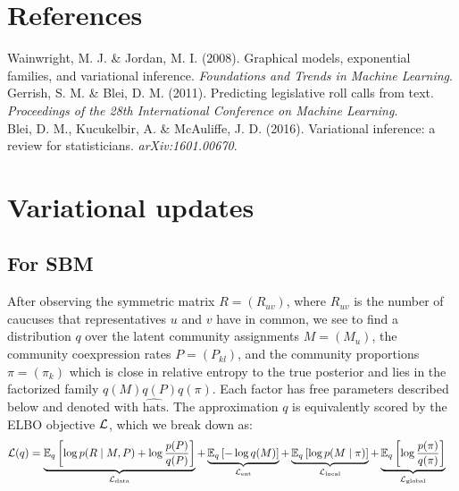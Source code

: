 \documentclass{article}
\begin{document}
\newpage


\section*{References}

\medskip

\small

\noindent[1] Wainwright, M. J. \& Jordan, M. I. (2008). Graphical models, exponential families, and variational inference. {\sl Foundations and Trends in Machine Learning}. \\

\noindent[2] Gerrish, S. M. \& Blei, D. M.  (2011). Predicting legislative roll calls from text. {\it Proceedings of the 28th International Conference on Machine Learning}. \\

\noindent[3] Blei, D. M., Kucukelbir, A. \& McAuliffe, J. D. (2016). Variational inference: a review for statisticians. {\sl arXiv:1601.00670}.


\appendix

\newpage

\section{Variational updates}

\subsection{For SBM}
\label{sbmvi}

After observing the symmetric matrix $R = (R_{uv})$, where $R_{uv}$ is the number of caucuses that representatives $u$ and $v$ have in common, we see to find a distribution $q$ over the latent community assignments $M = (M_u)$, the community coexpression rates $P = (P_{kl})$, and the community proportions $\pi = (\pi_k)$ which is close in relative entropy to the true posterior and lies in the factorized family $q(M)q(P)q(\pi)$. Each factor has free parameters described below and denoted with $\widehat{\text{hats}}$. The approximation $q$ is equivalently scored by the ELBO objective $\mathcal{L}$, which we break down as:%
\begin{equation}
\begin{split}
\mathcal{L}(q)
&= \underbrace{\mathbb{E}_q\left[\log p(R\mid M,P)+ \log\frac{p(P)}{q(P)}\right]}_{\mathcal{L}_{\text{data}}}
+ \underbrace{\mathbb{E}_q\left[-\log q(M)\right]}_{\mathcal{L}_{\text{ent}}}
+ \underbrace{\mathbb{E}_q\left[\log p(M\mid \pi)\right]}_{\mathcal{L}_{\text{local}}}
+ \underbrace{\mathbb{E}_q\left[\log\frac{p(\pi)}{q(\pi)}\right]}_{\mathcal{L}_{\text{global}}}
\end{split}
\end{equation}
\end{document}
